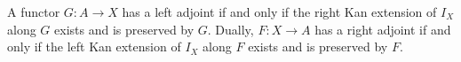 A functor $G: A \to X$ has a left adjoint if and only if the right Kan extension of $I_X$ along $G$ exists and is preserved by $G$. Dually, $F: X \to A$ has a right adjoint if and only if the left Kan extension of $I_X$ along $F$ exists and is preserved by $F$.
